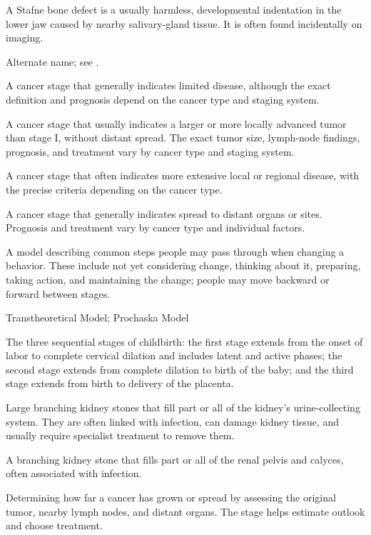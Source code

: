  A Stafne bone defect is a usually harmless, developmental indentation in the lower jaw caused by nearby salivary-gland tissue. It is often found incidentally on imaging.

 Alternate name; see .

 A cancer stage that generally indicates limited disease, although the exact definition and prognosis depend on the cancer type and staging system.

 A cancer stage that usually indicates a larger or more locally advanced tumor than stage I, without distant spread. The exact tumor size, lymph-node findings, prognosis, and treatment vary by cancer type and staging system.

 A cancer stage that often indicates more extensive local or regional disease, with the precise criteria depending on the cancer type.

 A cancer stage that generally indicates spread to distant organs or sites. Prognosis and treatment vary by cancer type and individual factors.

 A model describing common steps people may pass through when changing a behavior. These include not yet considering change, thinking about it, preparing, taking action, and maintaining the change; people may move backward or forward between stages.

\synonyms
Transtheoretical Model; Prochaska Model

 The three sequential stages of childbirth: the first stage extends from the onset of labor to complete cervical dilation and includes latent and active phases; the second stage extends from complete dilation to birth of the baby; and the third stage extends from birth to delivery of the placenta.

 Large branching kidney stones that fill part or all of the kidney's urine-collecting system. They are often linked with infection, can damage kidney tissue, and usually require specialist treatment to remove them.

 A branching kidney stone that fills part or all of the renal pelvis and calyces, often associated with infection.

 Determining how far a cancer has grown or spread by assessing the original tumor, nearby lymph nodes, and distant organs. The stage helps estimate outlook and choose treatment.

